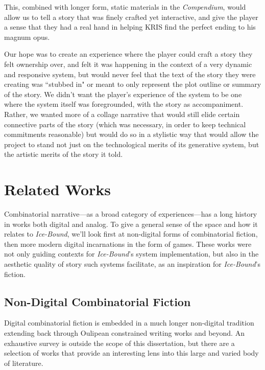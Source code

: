 This, combined with longer form, static materials in the \textit{Compendium}, would allow us to tell a story that was finely crafted yet interactive, and give the player a sense that they had a real hand in helping KRIS find the perfect ending to his magnum opus.

Our hope was to create an experience where the player could craft a story they felt ownership over, and felt it was happening in the context of a very dynamic and responsive system, but would never feel that the text of the story they were creating was ``stubbed in" or meant to only represent the plot outline or summary of the story. We didn't want the player's experience of the system to be one where the system itself was foregrounded, with the story as accompaniment. Rather, we wanted more of a collage narrative that would still elide certain connective parts of the story (which was necessary, in order to keep technical commitments reasonable) but would do so in a stylistic way that would allow the project to stand not just on the technological merits of its generative system, but the artistic merits of the story it told.

\section{Related Works}\label{sec:ib-related-works}
Combinatorial narrative---as a broad category of experiences---has a long history in works both digital and analog. To give a general sense of the space and how it relates to \textit{Ice-Bound}, we'll look first at non-digital forms of combinatorial fiction, then more modern digital incarnations in the form of games. These works were not only guiding contexts for \textit{Ice-Bound}'s system implementation, but also in the aesthetic quality of story such systems facilitate, as an inspiration for \textit{Ice-Bound}'s fiction.
\subsection{Non-Digital Combinatorial Fiction}\label{subsec:ib-non-digital-combinatorial}

Digital combinatorial fiction is embedded in a much longer non-digital tradition extending back through Oulipean constrained writing works and beyond. An exhaustive survey is outside the scope of this dissertation, but there are a selection of works that provide an interesting lens into this large and varied body of literature.


